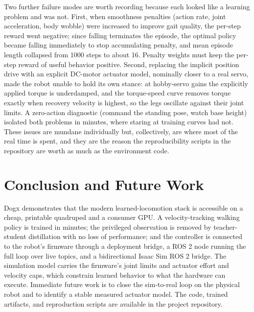\documentclass[11pt]{article}
\begin{document}
Two further failure modes are worth recording because each looked like a
learning problem and was not. First, when smoothness penalties (action rate,
joint acceleration, body wobble) were increased to improve gait quality, the
per-step reward went negative; since falling terminates the episode, the optimal
policy became falling immediately to stop accumulating penalty, and mean episode
length collapsed from 1000 steps to about 16. Penalty weights must keep the
per-step reward of useful behavior positive. Second, replacing the implicit
position drive with an explicit DC-motor actuator model, nominally closer to a
real servo, made the robot unable to hold its own stance: at hobby-servo gains
the explicitly applied torque is underdamped, and the torque-speed curve removes
torque exactly when recovery velocity is highest, so the legs oscillate against
their joint limits. A zero-action diagnostic (command the standing pose, watch
base height) isolated both problems in minutes, where staring at training curves
had not. These issues are mundane individually but, collectively, are where most
of the real time is spent, and they are the reason the reproducibility scripts in
the repository are worth as much as the environment code.

\section{Conclusion and Future Work}
Dogx demonstrates that the modern learned-locomotion stack is accessible on a
cheap, printable quadruped and a consumer GPU. A velocity-tracking walking policy
is trained in minutes; the privileged observation is removed by teacher-student
distillation with no loss of performance; and the controller is connected to the
robot's firmware through a deployment bridge, a ROS 2 node running the full loop
over live topics, and a bidirectional Isaac Sim ROS 2 bridge. The simulation
model carries the firmware's joint limits and actuator effort and velocity caps,
which constrain learned behavior to what the hardware can execute. Immediate
future work is to close the sim-to-real loop on the physical robot and to
identify a stable measured actuator model. The code, trained artifacts, and
reproduction scripts are available in the project repository.

\printbibliography
\end{document}
